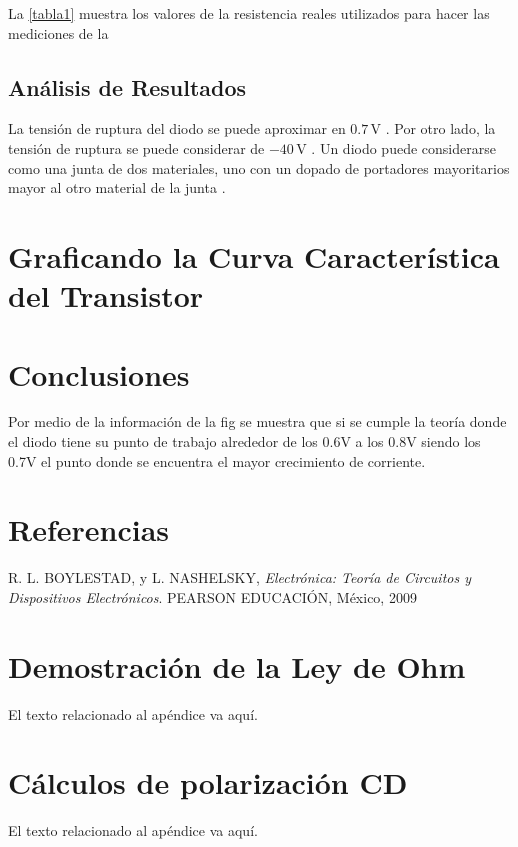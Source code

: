 \documentclass[journal]{IEEEtran}
\begin{document}
La \ref{tabla1} muestra los valores de la resistencia reales utilizados para hacer las mediciones de la 


\vspace{5mm}

\subsection{Análisis de Resultados}

La tensión de ruptura del diodo se puede aproximar en $0.7\,$V \cite{Malik1996,Boylestad,Horowitz1989,Gray1995}. Por otro lado, la tensión de ruptura se puede considerar de $-40\,$V \cite{Floyd2008,Behzad2013,Schilling1994}. Un diodo puede considerarse como una junta de dos materiales, uno con un dopado de portadores mayoritarios mayor al otro material de la junta \cite{Pierret1994}.\\




\section{Graficando la Curva Característica del Transistor}








\section{Conclusiones}
 Por medio de la información de la fig se muestra que si se cumple la teoría donde el diodo tiene su punto de trabajo alrededor de los 0.6V a los 0.8V siendo los 0.7V el punto donde se encuentra el mayor crecimiento de corriente.
 
\section{Referencias}
R. L. BOYLESTAD, y L. NASHELSKY, 
\textit{Electrónica: Teoría de Circuitos
y Dispositivos Electrónicos}. PEARSON EDUCACIÓN, México, 2009
\appendices
\section{Demostración de la Ley de Ohm}
El texto relacionado al apéndice va aquí.

\section{Cálculos de polarización CD}
El texto relacionado al apéndice va aquí.
\end{document}
